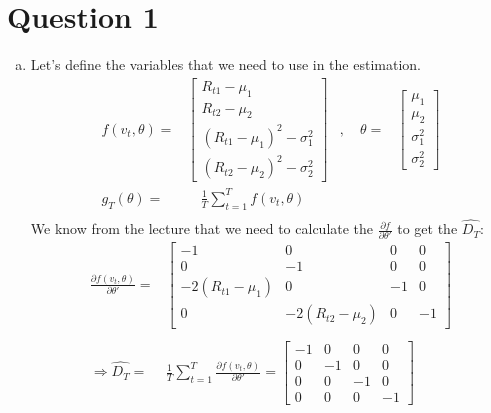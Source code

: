 
\section*{Question 1}
\begin{enumerate}[(a)]
  \item Let's define the variables that we need to use in the estimation.\\
  \begin{equation*}
  \begin{aligned}
    f(v_t,\theta) = & \begin{bmatrix}
      R_{t1} - \mu_1 \\
      R_{t2} - \mu_2 \\
      (R_{t1} - \mu_1)^2 - \sigma_1^2 \\
      (R_{t2} - \mu_2)^2 - \sigma_2^2
    \end{bmatrix} & , \quad 
    \theta = & \begin{bmatrix}
      \mu_1 \\
      \mu_2 \\
      \sigma_1^2 \\
      \sigma_2^2
    \end{bmatrix}  \\
    g_T(\theta) = & \quad \frac{1}{T} \sum_{t=1}^T f(v_t,\theta) & \\
  \end{aligned}
  \end{equation*}
We know from the lecture that we need to calculate the $\frac{\partial f}{\partial \theta'}$ to get the $\hat{D_T}$:
\begin{equation*}
  \begin{aligned}
    \frac{\partial f(v_t,\theta)}{\partial \theta'} = & \begin{bmatrix}
      -1 & 0 & 0 & 0 \\
      0 & -1 & 0 & 0 \\
      -2(R_{t1} - \mu_1) & 0 & -1 & 0 \\
      0 & -2(R_{t2} - \mu_2) & 0 & -1
    \end{bmatrix} \\\\
    \Rightarrow \hat{D_T} = & \frac{1}{T} \sum_{t=1}^T \frac{\partial f(v_t,\theta)}{\partial \theta'} = \begin{bmatrix}
      -1 & 0 & 0 & 0 \\
      0 & -1 & 0 & 0 \\
      0 & 0 & -1 & 0 \\
      0 & 0 & 0 & -1

\end{bmatrix}
\end{aligned}
\end{equation*}
\end{enumerate}
